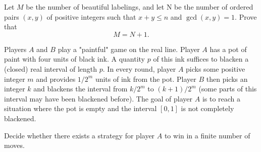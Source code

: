 Let 
$M$
 be the number of beautiful labelings, and let N be the number of ordered pairs 
$(x, y)$
 of positive integers such that 
$x + y \le n$
 and 
$\gcd(x, y) = 1$.
 Prove that 
$$M = N + 1.$$

\item[\textbf{C8.}]
Players 
$A$
 and 
$B$
 play a "paintful" game on the real line. Player 
$A$
 has a pot of paint with four units of black ink. A quantity 
$p$
 of this ink suffices to blacken a (closed) real interval of length 
$p$.
 In every round, player 
$A$
 picks some positive integer 
$m$
 and provides 
$1/2^m $
 units of ink from the pot. Player 
$B$
 then picks an integer 
$k$
 and blackens the interval from 
$k/2^m$
 to 
$(k+1)/2^m$
 (some parts of this interval may have been blackened before). The goal of player 
$A$
 is to reach a situation where the pot is empty and the interval 
$[0,1]$
 is not completely blackened.


Decide whether there exists a strategy for player 
$A$
 to win in a finite number of moves.

